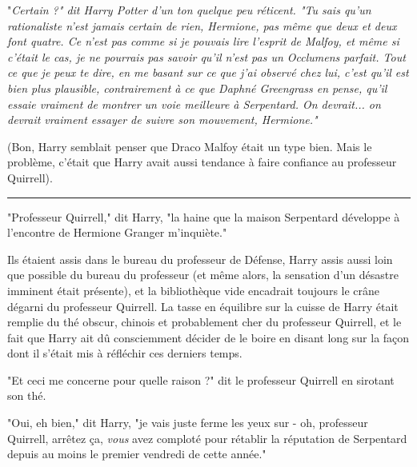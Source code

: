 "\emph{Certain ?" dit Harry Potter d'un ton quelque peu réticent. "Tu sais qu'un rationaliste n'est jamais certain de rien, Hermione, pas même que deux et deux font quatre. Ce n'est pas comme si je pouvais lire l'esprit de Malfoy, et même si c'était le cas, je ne pourrais pas savoir qu'il n'est pas un Occlumens parfait. Tout ce que je peux te dire, en me basant sur ce que j'ai observé chez lui, c'est qu'il est bien plus plausible, contrairement à ce que Daphné Greengrass en pense, qu'il essaie vraiment de montrer un voie meilleure à Serpentard. On devrait... on devrait vraiment essayer de suivre son mouvement, Hermione."} 

(Bon, Harry semblait penser que Draco Malfoy était un type bien. Mais le problème, c'était que Harry avait aussi tendance à faire confiance au professeur Quirrell).
\par\noindent\rule{\textwidth}{0.4pt}
"Professeur Quirrell," dit Harry, "la haine que la maison Serpentard développe à l'encontre de Hermione Granger m'inquiète."

Ils étaient assis dans le bureau du professeur de Défense, Harry assis aussi loin que possible du bureau du professeur (et même alors, la sensation d'un désastre imminent était présente), et la bibliothèque vide encadrait toujours le crâne dégarni du professeur Quirrell. La tasse en équilibre sur la cuisse de Harry était remplie du thé obscur, chinois et probablement cher du professeur Quirrell, et le fait que Harry ait dû consciemment décider de le boire en disant long sur la façon dont il s'était mis à réfléchir ces derniers temps.

"Et ceci me concerne pour quelle raison ?" dit le professeur Quirrell en sirotant son thé.

"Oui, eh bien," dit Harry, "je vais juste ferme les yeux sur - oh, professeur Quirrell, arrêtez ça, \emph{vous}  avez comploté pour rétablir la réputation de Serpentard depuis au moins le premier vendredi de cette année."

